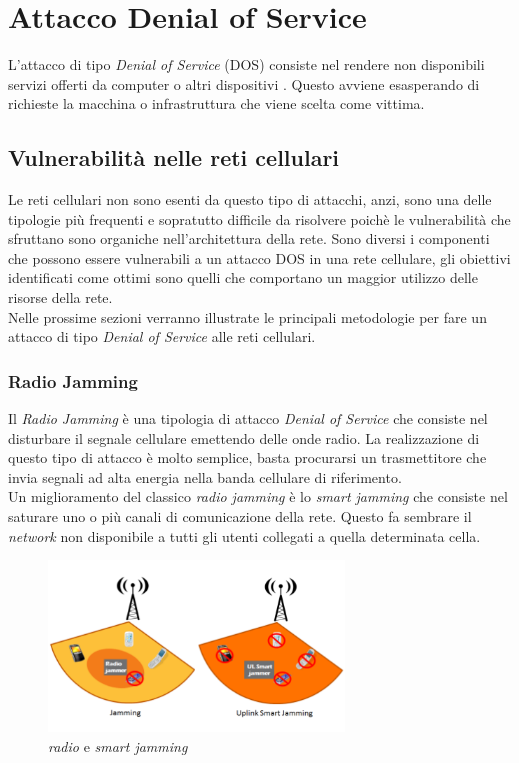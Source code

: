 \section{Attacco Denial of Service}
L'attacco di tipo \textit{Denial of Service} (DOS) consiste nel rendere non disponibili servizi offerti da computer o altri
dispositivi \cite{dos-definition}. Questo avviene esasperando di richieste la macchina o infrastruttura che viene scelta come
vittima.

\subsection{Vulnerabilità nelle reti cellulari}
Le reti cellulari non sono esenti da questo tipo di attacchi, anzi, sono una delle tipologie più frequenti e sopratutto difficile da risolvere
poichè le vulnerabilità che sfruttano sono organiche nell'architettura della rete.
Sono diversi i componenti che possono essere vulnerabili a un attacco DOS in una rete cellulare, gli obiettivi identificati come ottimi sono quelli
che comportano un maggior utilizzo delle risorse della rete.\\
Nelle prossime sezioni verranno illustrate le principali metodologie per fare un attacco di tipo \textit{Denial of Service} alle reti cellulari\cite{4g-dos-recap}.

\subsubsection{Radio Jamming}
Il \textit{Radio Jamming} è una tipologia di attacco \textit{Denial of Service} che consiste nel disturbare il segnale cellulare emettendo delle onde radio.
La realizzazione di questo tipo di attacco è molto semplice, basta procurarsi un trasmettitore che invia segnali ad alta energia nella banda cellulare di riferimento.\\
Un miglioramento del classico \textit{radio jamming} è lo \textit{smart jamming} che consiste nel saturare uno o più canali di comunicazione della rete. Questo fa sembrare 
il \textit{network} non disponibile a tutti gli utenti collegati a quella determinata cella.
\begin{figure}[h]
    \centering
    \includegraphics[width=0.7\textwidth]{images/dos-jamming.png}
    \caption{\textit{radio} e \textit{smart jamming}\cite{4g-dos-recap}}
\end{figure}\\

